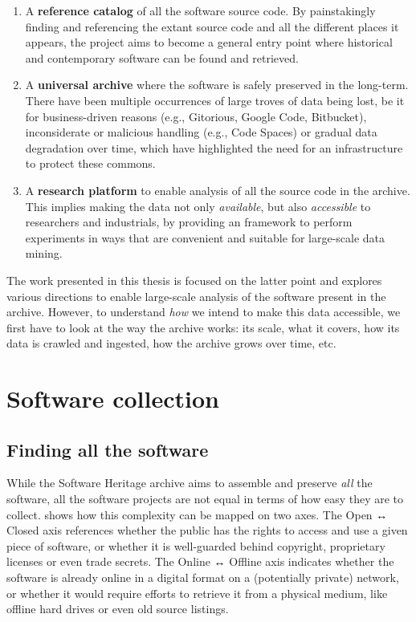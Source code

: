 \begin{enumerate}
    \item A \textbf{reference catalog} of all the software source code. By
        painstakingly finding and referencing the extant source code and
        all the different places it appears, the project aims to become a
        general entry point where historical and contemporary software can be
        found and retrieved.
    \item A \textbf{universal archive} where the software is safely preserved
        in the long-term. There have been multiple occurrences of large troves
        of data being lost, be it for business-driven reasons (e.g., Gitorious,
        Google Code, Bitbucket), inconsiderate or malicious handling (e.g.,
        Code Spaces) or gradual data degradation over time, which have
        highlighted the need for an infrastructure to protect these commons.
    \item A \textbf{research platform} to enable analysis of all the source
        code in the archive. This implies making the data not only
        \emph{available}, but also \emph{accessible} to researchers and
        industrials, by providing an framework to perform experiments in ways
        that are convenient and suitable for large-scale data mining.
\end{enumerate}

The work presented in this thesis is focused on the latter point and explores
various directions to enable large-scale analysis of the software present in
the archive. However, to understand \emph{how} we intend to make this data
accessible, we first have to look at the way the archive works: its scale, what
it covers, how its data is crawled and ingested, how the archive grows over
time, etc.

\section{Software collection}

\subsection{Finding all the software}

While the Software Heritage archive aims to assemble and preserve \emph{all}
the software, all the software projects are not equal in terms of how easy they
are to collect.  shows how this complexity can be
mapped on two axes. The Open ↔ Closed axis references whether the public has
the rights to access and use a given piece of software, or whether it is
well-guarded behind copyright, proprietary licenses or even trade secrets.
The Online ↔ Offline axis indicates whether the software is already online in a
digital format on a (potentially private) network, or whether it would require
efforts to retrieve it from a physical medium, like offline hard drives or even
old source listings.

